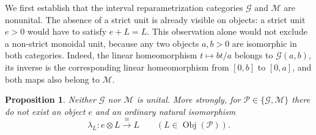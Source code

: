\documentclass[12pt,a4paper]{amsart}
\newcommand{\Pcat}{\mathcal P}
\newcommand{\G}{\mathcal G}
\newcommand{\M}{\mathcal M}
\newcommand{\Obj}{\operatorname{Obj}}
\newtheorem{proposition}[thm]{Proposition}
\theoremstyle{definition}
\begin{document}
We first establish that the interval reparametrization categories \(\G\) and \(\M\) are nonunital. The absence of a strict unit is already visible on objects: a strict unit \(e>0\) would have to satisfy \(e+L=L\).  This observation alone would not exclude a non-strict monoidal unit, because any two objects \(a,b>0\) are isomorphic in both categories.  Indeed, the linear homeomorphism \(t\mapsto bt/a\) belongs to \(\G(a,b)\), its inverse is the corresponding linear homeomorphism from \([0,b]\) to \([0,a]\), and both maps also belong to \(\M\).

\begin{proposition}\label{prop:GM-nonunital}
	Neither \(\G\) nor \(\M\) is unital.  More strongly, for \(\Pcat\in\{\G,\M\}\) there do not exist an object \(e\) and an ordinary natural isomorphism
	\[
	\lambda_L: e\otimes L\xrightarrow{\cong}L
	\qquad(L\in\Obj(\Pcat)).
	\]
\end{proposition}
\end{document}
